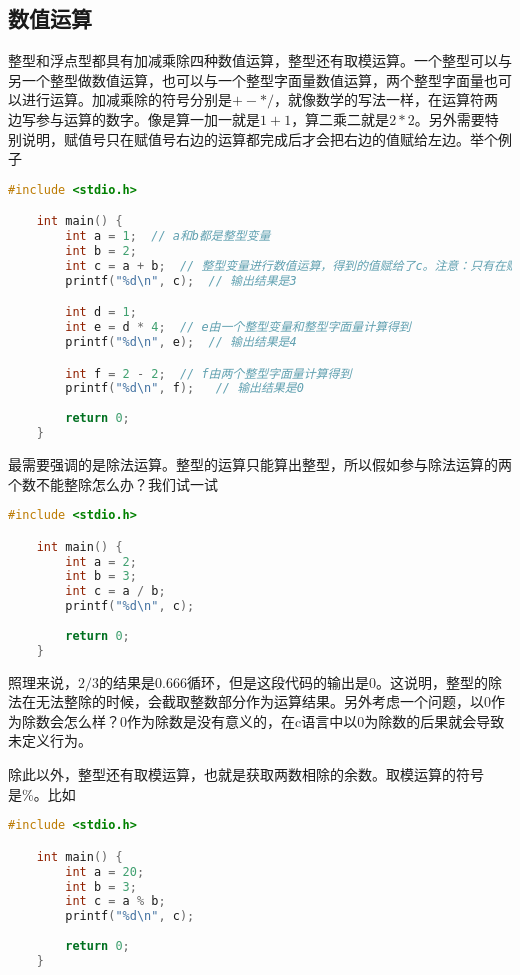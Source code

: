 \subsection{数值运算}

整型和浮点型都具有加减乘除四种数值运算，整型还有取模运算。一个整型可以与另一个整型做数值运算，也可以与一个整型字面量数值运算，两个整型字面量也可以进行运算。加减乘除的符号分别是$+-*/$，就像数学的写法一样，在运算符两边写参与运算的数字。像是算一加一就是$1+1$，算二乘二就是$2*2$。另外需要特别说明，赋值号只在赋值号右边的运算都完成后才会把右边的值赋给左边。举个例子

\begin{lstlisting}[language=C]
    #include <stdio.h>

    int main() {
        int a = 1;  // a和b都是整型变量
        int b = 2;
        int c = a + b;  // 整型变量进行数值运算，得到的值赋给了c。注意：只有在赋值号右边的运算完成后，赋值号才进行赋值
        printf("%d\n", c);  // 输出结果是3

       	int d = 1;
        int e = d * 4;  // e由一个整型变量和整型字面量计算得到
        printf("%d\n", e);  // 输出结果是4

        int f = 2 - 2;  // f由两个整型字面量计算得到
        printf("%d\n", f);   // 输出结果是0
        
        return 0;
    }
\end{lstlisting}

最需要强调的是除法运算。整型的运算只能算出整型，所以假如参与除法运算的两个数不能整除怎么办？我们试一试

\begin{lstlisting}[language=C]
    #include <stdio.h>

    int main() {
        int a = 2;
        int b = 3;
        int c = a / b;
        printf("%d\n", c);
        
        return 0;
    }
\end{lstlisting}

照理来说，$2/3$的结果是0.666循环，但是这段代码的输出是0。这说明，整型的除法在无法整除的时候，会截取整数部分作为运算结果。另外考虑一个问题，以0作为除数会怎么样？0作为除数是没有意义的，在c语言中以0为除数的后果就会导致未定义行为。

除此以外，整型还有取模运算，也就是获取两数相除的余数。取模运算的符号是\%。比如

\begin{lstlisting}[language=C]
    #include <stdio.h>

    int main() {
        int a = 20;
        int b = 3;
        int c = a % b;
        printf("%d\n", c);
        
        return 0;
    }
\end{lstlisting}


